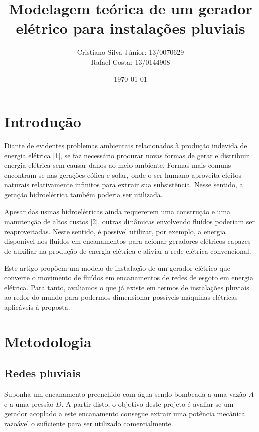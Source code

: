 \documentclass[12pt, a4paper, twoside]{article}
\begin{document}
\title{Modelagem teórica de um gerador elétrico para instalações pluviais}
\author{Cristiano Silva Júnior: 13/0070629 \\
Rafael Costa: 13/0144908}
\date{\today}
\maketitle

\section{Introdução}

Diante de evidentes problemas ambientais relacionados à produção indevida de
energia elétrica [1], se faz necessário procurar novas formas de gerar e
distribuir energia elétrica sem causar danos ao meio ambiente. Formas mais
comuns encontram-se nas gerações eólica e solar, onde o ser humano aproveita
efeitos naturais relativamente infinitos para extrair sua subsistência. Nesse
sentido, a geração hidroelétrica também poderia ser utilizada.

Apesar das usinas hidroelétricas ainda requererem uma construção e uma
manutenção de altos custos [2], outras dinâmicas envolvendo fluídos poderiam
ser reaproveitadas. Neste sentido, é possível utilizar, por exemplo, a energia
disponível nos fluídos em encanamentos para acionar geradores elétricos capazes
de auxiliar na produção de energia elétrica e aliviar a rede elétrica
convencional.

Este artigo propõem um modelo de instalação de um gerador elétrico que converte
o movimento de fluídos em encanamentos de redes de esgoto em energia elétrica.
Para tanto, avaliamos o que já existe em termos de instalações pluviais ao
redor do mundo para podermos dimensionar possíveis máquinas elétricas
aplicáveis à proposta.

\section{Metodologia}

\subsection{Redes pluviais}

Suponha um encanamento preenchido com água sendo bombeada a uma vazão $A$ e a uma pressão $D$. A partir disto, o objetivo deste projeto é avaliar se um gerador acoplado a este encanamento consegue extrair uma potência mecânica razoável o suficiente para ser utilizado comercialmente.
\end{document}
